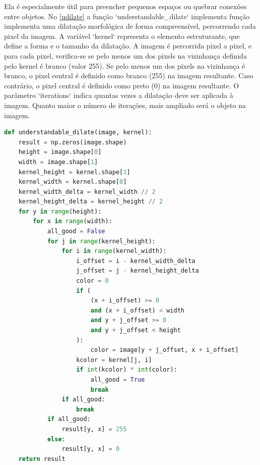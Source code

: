 \documentclass[english, 
               brazil, 
               bsc] %
               {dcomp-abntex2}
\begin{document}
Ela é especialmente útil para preencher pequenos espaços ou quebrar conexões entre objetos. No \autoref{udilate} a função `understandable\_dilate` implementa função implementa uma dilatação morfológica de forma compreensível, percorrendo cada pixel da imagem.
A variável `kernel` representa o elemento estruturante, que define a forma e o tamanho da dilatação.
A imagem é percorrida pixel a pixel, e para cada pixel, verifica-se se pelo menos um dos pixels na vizinhança definida pelo kernel é branco (valor 255).
Se pelo menos um dos pixels na vizinhança é branco, o pixel central é definido como branco (255) na imagem resultante.
Caso contrário, o pixel central é definido como preto (0) na imagem resultante.
O parâmetro `iterations` indica quantas vezes a dilatação deve ser aplicada à imagem. Quanto maior o número de iterações, mais ampliado será o objeto na imagem.

\begin{codigo}[h]
  \caption{\small .}
 \label{udilate}
\begin{lstlisting}[language=python]
def understandable_dilate(image, kernel):
    result = np.zeros(image.shape)
    height = image.shape[0]
    width = image.shape[1]
    kernel_height = kernel.shape[1]
    kernel_width = kernel.shape[0]
    kernel_width_delta = kernel_width // 2
    kernel_height_delta = kernel_height // 2
    for y in range(height):
        for x in range(width):
            all_good = False
            for j in range(kernel_height):
                for i in range(kernel_width):
                    i_offset = i - kernel_width_delta
                    j_offset = j - kernel_height_delta
                    color = 0
                    if (
                        (x + i_offset) >= 0
                        and (x + i_offset) < width
                        and y + j_offset >= 0
                        and y + j_offset < height
                    ):
                        color = image[y + j_offset, x + i_offset]
                    kcolor = kernel[j, i]
                    if int(kcolor) * int(color):
                        all_good = True
                        break
                if all_good:
                    break
            if all_good:
                result[y, x] = 255
            else:
                result[y, x] = 0
    return result
\end{lstlisting}
\end{codigo}
\end{document}
